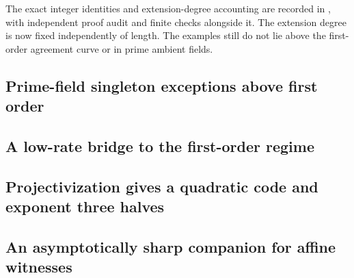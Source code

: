The exact integer identities and extension-degree accounting are recorded
in ,
with independent proof audit and finite checks alongside it.
The extension degree is now fixed independently of length. The examples
still do not lie above the first-order agreement curve or in prime ambient fields.



\subsection{Prime-field singleton exceptions above first order}















\subsection{A low-rate bridge to the first-order regime}


\subsection{Projectivization gives a quadratic code and exponent three halves}








\subsection{An asymptotically sharp companion for affine witnesses}

